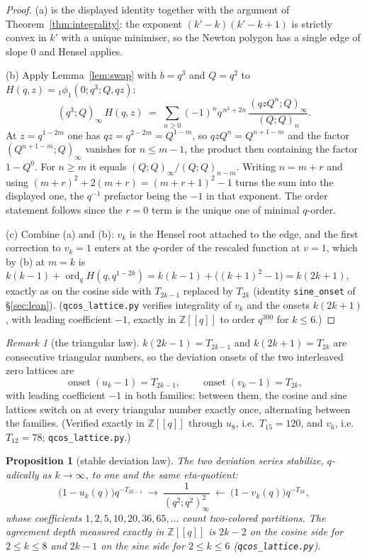 \documentclass[11pt]{article}
\theoremstyle{plain}
\newtheorem{proposition}[theorem]{Proposition}
\theoremstyle{definition}
\theoremstyle{remark}
\newtheorem{remark}[theorem]{Remark}
\newcommand{\Z}{\mathbb{Z}}
\begin{document}
\begin{proof}
(a) is the displayed identity together with the argument of
Theorem~\ref{thm:integrality}: the exponent $(k'-k)(k'-k+1)$ is strictly convex in $k'$ with a
unique minimiser, so the Newton polygon has a single edge of slope $0$ and Hensel applies.

(b) Apply Lemma~\ref{lem:swap} with $b=q^3$ and $Q=q^2$ to $H(q,z)={}_1\phi_1(0;q^3;Q,qz)$:
\[
   (q^3;Q)_\infty\,H(q,z)\;=\;\sum_{n\ge0}(-1)^n q^{\,n^2+2n}\,
      \frac{(qzQ^n;Q)_\infty}{(Q;Q)_n}.
\]
At $z=q^{1-2m}$ one has $qz=q^{2-2m}=Q^{1-m}$, so $qzQ^n=Q^{n+1-m}$ and the factor
$(Q^{n+1-m};Q)_\infty$ vanishes for $n\le m-1$, the product then containing the factor $1-Q^0$.
For $n\ge m$ it equals $(Q;Q)_\infty/(Q;Q)_{n-m}$. Writing $n=m+r$ and using
$(m+r)^2+2(m+r)=(m+r+1)^2-1$ turns the sum into the displayed one, the $q^{-1}$ prefactor being
the $-1$ in that exponent. The order statement follows since the $r=0$ term is the unique one of
minimal $q$-order.

(c) Combine (a) and (b): $v_k$ is the Hensel root attached to the edge, and the first correction
to $v_k=1$ enters at the $q$-order of the rescaled function at $v=1$, which by (b) at $m=k$ is
$k(k-1)+\operatorname{ord}_qH(q,q^{1-2k})=k(k-1)+\bigl((k+1)^2-1\bigr)=k(2k+1)$, exactly as on the
cosine side with $T_{2k-1}$ replaced by $T_{2k}$ (identity \texttt{sine\_onset} of
\S\ref{sec:lean}).
(\texttt{qcos\_lattice.py} verifies integrality of $v_k$ and the onsets $k(2k+1)$, with
leading coefficient $-1$, exactly in $\Z[[q]]$ to order $q^{300}$ for $k\le6$.)
\end{proof}

\begin{remark}[the triangular law]\label{rem:triangular}
$k(2k-1)=T_{2k-1}$ and $k(2k+1)=T_{2k}$ are consecutive triangular numbers, so the deviation
onsets of the two interleaved zero lattices are
\[
   \operatorname{onset}(u_k-1)=T_{2k-1},\qquad
   \operatorname{onset}(v_k-1)=T_{2k},
\]
with leading coefficient $-1$ in both families: between them, the cosine and sine lattices switch
on at every triangular number exactly once, alternating between the families. (Verified exactly in
$\Z[[q]]$ through $u_8$, i.e.\ $T_{15}=120$, and $v_6$, i.e.\ $T_{12}=78$;
\texttt{qcos\_lattice.py}.)
\end{remark}

\begin{proposition}[stable deviation law]\label{prop:stablelaw}
The two deviation series stabilize, $q$-adically as $k\to\infty$, to one and the same
eta-quotient:
\[
   \bigl(1-u_k(q)\bigr)q^{-T_{2k-1}}\ \longrightarrow\ \frac1{(q^2;q^2)_\infty^{2}}\
   \longleftarrow\ \bigl(1-v_k(q)\bigr)q^{-T_{2k}} ,
\]
whose coefficients $1,2,5,10,20,36,65,\dots$ count two-colored partitions. The agreement depth
measured exactly in $\Z[[q]]$ is $2k-2$ on the cosine side for $2\le k\le8$ and $2k-1$ on the
sine side for $2\le k\le6$ (\texttt{qcos\_lattice.py}).
\end{proposition}
\end{document}
